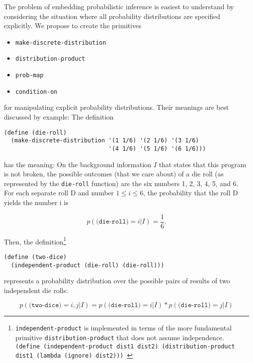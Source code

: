 \documentclass[12pt]{article}
\newcommand{\code}[1]{\texttt{#1}}
\begin{document}
The problem of embedding probabilistic inference is easiest to
understand by considering the situation where all probability
distributions are specified explicitly.  We propose to create the
primitives
\begin{itemize}
\item \code{make-discrete-distribution}
\item \code{distribution-product}
\item \code{prob-map}
\item \code{condition-on}
\end{itemize}
for manipulating explicit probability distributions.  Their meanings
are best discussed by example:  The definition
\begin{verbatim}
(define (die-roll)
  (make-discrete-distribution '(1 1/6) '(2 1/6) '(3 1/6)
                              '(4 1/6) '(5 1/6) '(6 1/6)))
\end{verbatim}
has the meaning: On the background information $I$ that states that
this program is not broken, the possible outcomes (that we care about)
of a die roll (as represented by the \code{die-roll} function) are the six
numbers 1, 2, 3, 4, 5, and 6.  For each separate roll D and number
$1 \leq i\leq 6$, the probability that the roll D yields the number i
is

\[ p( \code{(die-roll)} = i | I) = \frac{1}{6}. \]

Then, the definition\footnote{\code{independent-product} is
implemented in terms of the more fundamental primitive
\code{distribution-product} that does not assume independence.
\code{
(define (independent-product dist1 dist2)
  (distribution-product dist1 (lambda (ignore) dist2)))
}}
\begin{verbatim}
(define (two-dice)
  (independent-product (die-roll) (die-roll)))
\end{verbatim}
represents a probability distribution over the possible pairs of
results of two independent die rolls:

\[ p( \code{(two-dice)} = i, j | I) =
   p( \code{(die-roll)} = i | I) * p( \code{(die-roll)} = j | I) \]
\end{document}
